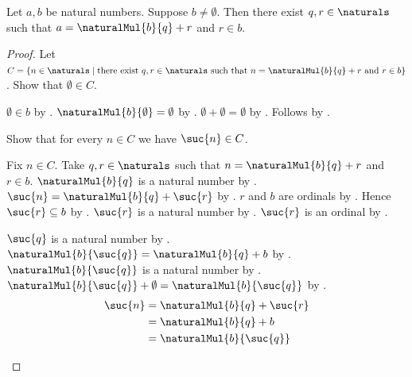 \begin{theorem}\label{natural_division_algorithm}
    Let $a,b$ be natural numbers.
    Suppose $b\neq\emptyset$.
    Then there exist $q,r\in\naturals$ such that
        $a=\naturalMul{b}{q}+r$ and $r\in b$.
\end{theorem}
\begin{proof}
    Let $C=\{n\in\naturals\mid
        \text{there exist $q,r\in\naturals$ such that
            $n=\naturalMul{b}{q}+r$ and $r\in b$}\}$.
    Show that $\emptyset\in C$.
    \begin{subproof}
        $\emptyset\in b$ by .
        $\naturalMul{b}{\emptyset}=\emptyset$
            by .
        $\emptyset+\emptyset=\emptyset$
            by .
        Follows by .
    \end{subproof}
    Show that for every $n\in C$ we have $\suc{n}\in C$.
    \begin{subproof}
        Fix $n\in C$.
        Take $q,r\in\naturals$ such that
            $n=\naturalMul{b}{q}+r$ and $r\in b$.
        $\naturalMul{b}{q}$ is a natural number
            by .
        $\suc{n}=\naturalMul{b}{q}+\suc{r}$
            by .
        $r$ and $b$ are ordinals by .
        Hence $\suc{r}\subseteq b$ by .
        $\suc{r}$ is a natural number by .
        $\suc{r}$ is an ordinal by .
        \begin{byCase}
                $\suc{q}$ is a natural number by .
                $\naturalMul{b}{\suc{q}}
                    =\naturalMul{b}{q}+b$
                    by .
                $\naturalMul{b}{\suc{q}}$ is a natural number
                    by .
                $\naturalMul{b}{\suc{q}}+\emptyset
                    =\naturalMul{b}{\suc{q}}$
                    by .
                \begin{align*}
                    \suc{n}
                        &= \naturalMul{b}{q}+\suc{r}
                        \\
                        &= \naturalMul{b}{q}+b
                        \\
                        &= \naturalMul{b}{\suc{q}}

\end{align*}
\end{byCase}
\end{subproof}
\end{proof}
